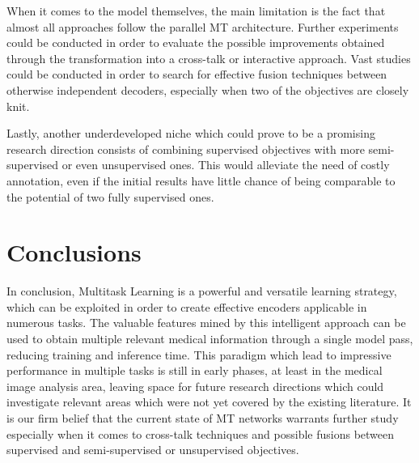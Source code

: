 \documentclass[conference]{IEEEtran}
\begin{document}
When it comes to the model themselves, the main limitation is the fact that almost all approaches follow the parallel MT architecture. Further experiments could be conducted in order to evaluate the possible improvements obtained through the transformation into a cross-talk or interactive approach. Vast studies could be conducted in order to search for effective fusion techniques between otherwise independent decoders, especially when two of the objectives are closely knit. 

Lastly, another underdeveloped niche which could prove to be a promising research direction consists of combining supervised objectives with more semi-supervised or even unsupervised ones. This would alleviate the need of costly annotation, even if the initial results have little chance of being comparable to the potential of two fully supervised ones. 


\section{Conclusions}
\label{chapter:5-Conclusions}

In conclusion, Multitask Learning is a powerful and versatile learning strategy, which can be exploited in order to create effective encoders applicable in numerous tasks. The valuable features mined by this intelligent approach can be used to obtain multiple relevant medical information through a single model pass, reducing training and inference time. This paradigm which lead to impressive performance in multiple tasks is still in early phases, at least in the medical image analysis area, leaving space for future research directions which could investigate relevant areas which were not yet covered by the existing literature. It is our firm belief that the current state of MT networks warrants further study especially when it comes to  cross-talk techniques and possible fusions between supervised and semi-supervised or unsupervised objectives.  

\balance



%
%
%
% 








\end{document}
